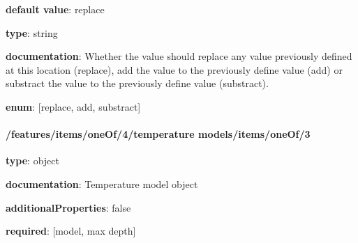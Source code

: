 \begin{itemized}
\item {\bf default value}: replace
\item {\bf type}: string
\item {\bf documentation}: Whether the value should replace any value previously defined at this location (replace), add the value to the previously define value (add) or substract the value to the previously define value (substract).
\item {\bf enum}: [replace, add, substract]\end{itemized}\paragraph{/features/items/oneOf/4/temperature models/items/oneOf/3} \begin{itemized}
\item {\bf type}: object
\item {\bf documentation}: Temperature model object
\item {\bf additionalProperties}: false
\item {\bf required}: [model, max depth]\end{itemized}
